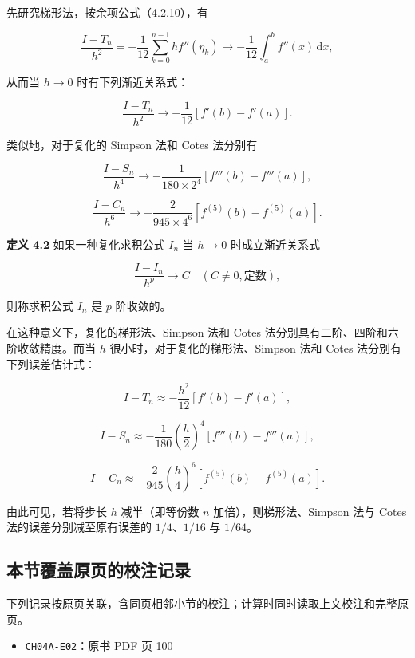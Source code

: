 \documentclass[
  10pt,
  fontset=fandol]{ctexart}
\providecommand{\tightlist}{%
  \setlength{\itemsep}{0pt}\setlength{\parskip}{0pt}}
\begin{document}
先研究梯形法，按余项公式（4.2.10），有

\[
\frac{I-T_n}{h^2}=-\frac1{12}\sum_{k=0}^{n-1}hf''(\eta_k)\to-\frac1{12}\int_a^b f''(x)\,\mathrm{d}x,
\]

从而当 \(h\to0\) 时有下列渐近关系式：

\[
\frac{I-T_n}{h^2}\to-\frac1{12}[f'(b)-f'(a)].
\]

类似地，对于复化的 Simpson 法和 Cotes 法分别有

\[
\frac{I-S_n}{h^4}\to-\frac1{180\times2^4}[f'''(b)-f'''(a)],
\]

\[
\frac{I-C_n}{h^6}\to-\frac2{945\times4^6}[f^{(5)}(b)-f^{(5)}(a)].
\]

\textbf{定义 4.2} 如果一种复化求积公式 \(I_n\) 当 \(h\to0\) 时成立渐近关系式

\[
\frac{I-I_n}{h^p}\to C\quad(C\ne0,\text{定数}),
\]

则称求积公式 \(I_n\) 是 \(p\) 阶收敛的。

在这种意义下，复化的梯形法、Simpson 法和 Cotes 法分别具有二阶、四阶和六阶收敛精度。而当 \(h\) 很小时，对于复化的梯形法、Simpson 法和 Cotes 法分别有下列误差估计式：

\[
I-T_n\approx-\frac{h^2}{12}[f'(b)-f'(a)],
\tag{4.2.15}
\]

\[
I-S_n\approx-\frac1{180}\left(\frac h2\right)^4[f'''(b)-f'''(a)],
\tag{4.2.16}
\]

\[
I-C_n\approx-\frac2{945}\left(\frac h4\right)^6[f^{(5)}(b)-f^{(5)}(a)].
\tag{4.2.17}
\]

由此可见，若将步长 \(h\) 减半（即等份数 \(n\) 加倍），则梯形法、Simpson 法与 Cotes 法的误差分别减至原有误差的 \(1/4\)、\(1/16\) 与 \(1/64\)。

\subsection{本节覆盖原页的校注记录}\label{ux672cux8282ux8986ux76d6ux539fux9875ux7684ux6821ux6ce8ux8bb0ux5f55}

下列记录按原页关联，含同页相邻小节的校注；计算时同时读取上文校注和完整原页。

\begin{itemize}
\tightlist
\item
  \texttt{CH04A-E02}：原书 PDF 页 100
\end{itemize}
\end{document}
